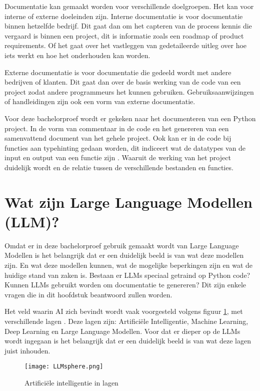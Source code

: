 Documentatie kan gemaakt worden voor verschillende doelgroepen. Het kan voor interne of externe doeleinden zijn.
Interne documentatie is voor documentatie binnen hetzelfde bedrijf.
Dit gaat dan om het capteren van de process kennis die vergaard is binnen een project, dit is informatie zoals een roadmap of product requirements. 
Of het gaat over het vastleggen van gedetaileerde uitleg over hoe iets werkt en hoe het onderhouden kan worden.

Externe documentatie is voor documentatie die gedeeld wordt met andere bedrijven of klanten. 
Dit gaat dan over de basis werking van de code van een project zodat andere programmeurs het kunnen gebruiken.
Gebruiksaanwijzingen of handleidingen zijn ook een vorm van externe documentatie. \autocite{swimm.io2024}

Voor deze bachelorproef wordt er gekeken naar het documenteren van een Python project.
In de vorm van commentaar in de code en het genereren van een samenvattend document van het gehele project.
Ook kan er in de code bij functies aan typehinting gedaan worden, dit indiceert wat de datatypes van de input en output van een functie zijn \autocite{Bailey2024}.
Waaruit de werking van het project duidelijk wordt en de relatie tussen de verschillende bestanden en functies.

\section{Wat zijn Large Language Modellen (LLM)?}
\label{sec:wat-zijn-llms}

Omdat er in deze bachelorproef gebruik gemaakt wordt van Large Language Modellen is het belangrijk dat er een duidelijk beeld is van wat deze modellen zijn.
En wat deze modellen kunnen, wat de mogelijke beperkingen zijn en wat de huidige stand van zaken is. 
Bestaan er LLMs speciaal getraind op Python code? Kunnen LLMs gebruikt worden om documentatie te genereren? 
Dit zijn enkele vragen die in dit hoofdstuk beantwoord zullen worden. 

Het veld waarin AI zich bevindt wordt vaak voorgesteld volgens figuur \ref{fig:LLM-position}, met verschillende lagen \autocite{Stoeffelbauer2023}.
Deze lagen zijn: Artificiële Intelligentie, Machine Learning, Deep Learning en Large Language Modellen.
Voor dat er dieper op de LLMs wordt ingegaan is het belangrijk dat er een duidelijk beeld is van wat deze lagen juist inhouden.

\begin{figure}[h]
  \centering
  \texttt{[image: LLMsphere.png]}
  \caption{Artificiële intelligentie in lagen \autocite{Stoeffelbauer2023}}
  \label{fig:LLM-position}
\end{figure}

